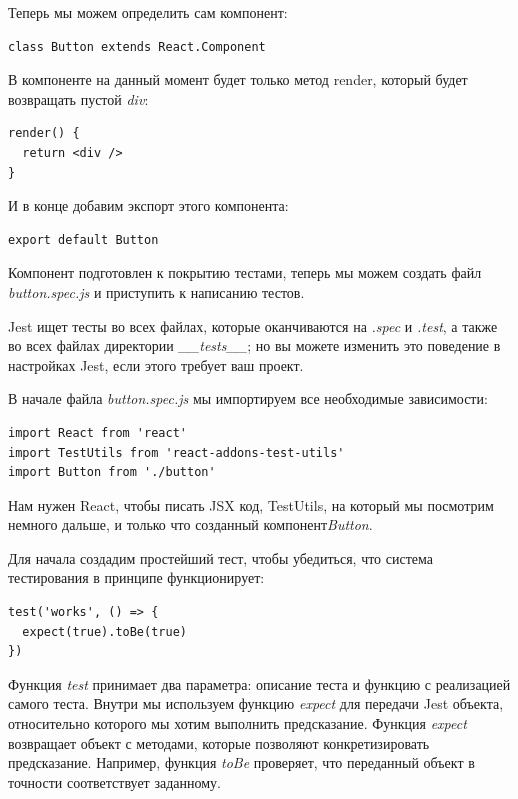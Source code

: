 Теперь мы можем определить сам компонент:

\begin{lstlisting}
class Button extends React.Component
\end{lstlisting}

В компоненте на данный момент будет только метод render, который будет возвращать пустой \textit{div}:

\begin{lstlisting}
render() {
  return <div />
}
\end{lstlisting}

И в конце добавим экспорт этого компонента:

\begin{lstlisting}
export default Button
\end{lstlisting}

Компонент подготовлен к покрытию тестами, теперь мы можем создать файл \textit{button.spec.js} и приступить к написанию тестов.

Jest ищет тесты во всех файлах, которые оканчиваются на \textit{.spec} и \textit{.test}, а также во всех файлах директории \textit{\_\_tests\_\_}; но вы можете изменить это поведение в настройках Jest, если этого требует ваш проект.

В начале файла \textit{button.spec.js} мы импортируем все необходимые зависимости:

\begin{lstlisting}
import React from 'react'
import TestUtils from 'react-addons-test-utils'
import Button from './button'
\end{lstlisting}

Нам нужен React, чтобы писать JSX код, TestUtils, на который мы посмотрим немного дальше, и только что созданный компонент\textit{Button}.

Для начала создадим простейший тест, чтобы убедиться, что система тестирования в принципе функционирует:

\begin{lstlisting}
test('works', () => {
  expect(true).toBe(true)
})
\end{lstlisting}

Функция \textit{test} принимает два параметра: описание теста и функцию с реализацией самого теста. Внутри мы используем функцию \textit{expect} для передачи Jest объекта, относительно которого мы хотим выполнить предсказание. Функция \textit{expect} возвращает объект с методами, которые позволяют конкретизировать предсказание. Например, функция \textit{toBe} проверяет, что переданный объект в точности соответствует заданному. 

